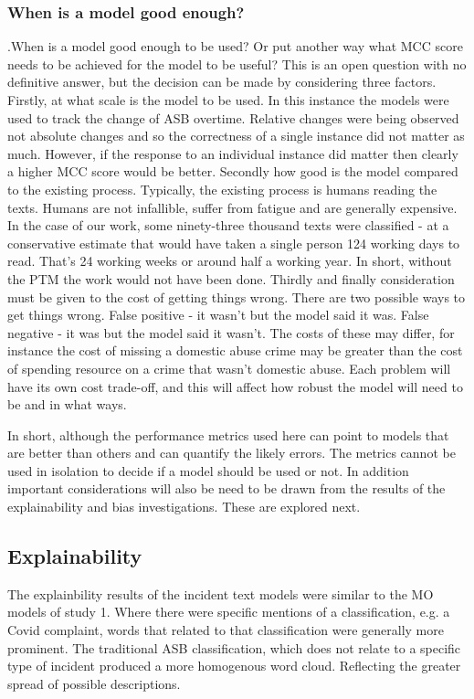  \subsubsection{When is a model good enough?}  .When is a model good enough to be used? Or put another way what MCC score needs to be achieved for the model to be useful? This is an open question with no definitive answer, but the decision can be made by considering three factors. Firstly, at what scale is the model to be used. In this instance the models were used to track the change of ASB overtime. Relative changes were being observed not absolute changes and so the correctness of a single instance did not matter as much. However, if the response to an individual instance did matter then clearly a higher MCC score would be better. Secondly how good is the model compared to the existing process. Typically, the existing process is humans reading the texts. Humans are not infallible, suffer from fatigue and are generally expensive. In the case of our work, some ninety-three thousand texts were classified - at a conservative estimate that would have taken a single person 124 working days to read. That's 24 working weeks or around half a working year. In short, without the PTM the work would not have been done. Thirdly and finally consideration must be given to the cost of getting things wrong. There are two possible ways to get things wrong. False positive - it wasn't but the model said it was. False negative - it was but the model said it wasn't. The costs of these may differ, for instance the cost of missing a domestic abuse crime may be greater than the cost of spending resource on a crime that wasn't domestic abuse. Each problem will have its own cost trade-off, and this will affect how robust the model will need to be and in what ways.
 
In short, although the performance metrics used here can point to models that are better than others and can quantify the likely errors. The metrics cannot be used in isolation to decide if a model should be used or not. In addition important considerations will also be need to be drawn from the results of the explainability and bias investigations. These are explored next.


\subsection{Explainability} The explainbility results of the incident text models were similar to the MO models of study 1. Where there were specific mentions of a classification, e.g. a Covid complaint,  words that related to that classification were generally more prominent. The traditional ASB classification, which does not relate to a specific type of incident produced a more homogenous word cloud. Reflecting the greater spread of possible descriptions. 

